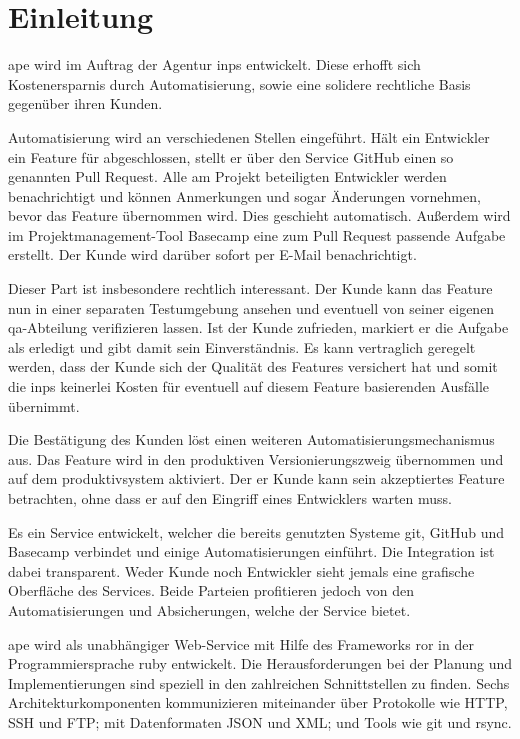 \section{Einleitung} %
\label{sec:einleitung}

\gls{ape} wird im Auftrag der Agentur \gls{inps} entwickelt. Diese erhofft sich Kostenersparnis durch Automatisierung, sowie eine solidere rechtliche Basis gegenüber ihren Kunden.

Automatisierung wird an verschiedenen Stellen eingeführt. Hält ein Entwickler ein Feature für abgeschlossen, stellt er über den Service GitHub einen so genannten Pull Request. Alle am Projekt beteiligten Entwickler werden benachrichtigt und können Anmerkungen und sogar Änderungen vornehmen, bevor das Feature übernommen wird. Dies geschieht automatisch. Außerdem wird im Projektmanagement-Tool Basecamp eine zum Pull Request passende Aufgabe erstellt. Der Kunde wird darüber sofort per E-Mail benachrichtigt.

Dieser Part ist insbesondere rechtlich interessant. Der Kunde kann das Feature nun in einer separaten Testumgebung ansehen und eventuell von seiner eigenen \gls{qa}-Abteilung verifizieren lassen. Ist der Kunde zufrieden, markiert er die Aufgabe als erledigt und gibt damit sein Einverständnis. Es kann vertraglich geregelt werden, dass der Kunde sich der Qualität des Features versichert hat und somit die \gls{inps} keinerlei Kosten für eventuell auf diesem Feature basierenden Ausfälle übernimmt.

Die Bestätigung des Kunden löst einen weiteren Automatisierungsmechanismus aus. Das Feature wird in den produktiven Versionierungszweig übernommen und auf dem \gls{produktivsystem} aktiviert. Der er Kunde kann sein akzeptiertes Feature betrachten, ohne dass er auf den Eingriff eines Entwicklers warten muss.

Es ein Service entwickelt, welcher die bereits genutzten Systeme git, GitHub und Basecamp verbindet und einige Automatisierungen einführt. Die Integration ist dabei transparent. Weder Kunde noch Entwickler sieht jemals eine grafische Oberfläche des Services. Beide Parteien profitieren jedoch von den Automatisierungen und Absicherungen, welche der Service bietet.

\gls{ape} wird als unabhängiger Web-Service mit Hilfe des Frameworks \gls{ror} in der Programmiersprache \gls{ruby} entwickelt. Die Herausforderungen bei der Planung und Implementierungen sind speziell in den zahlreichen Schnittstellen zu finden. Sechs Architekturkomponenten kommunizieren miteinander über Protokolle wie HTTP, SSH und FTP; mit Datenformaten JSON und XML; und Tools wie git und rsync.

